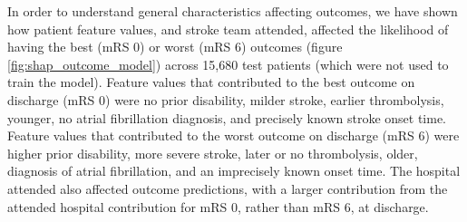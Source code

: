 In order to understand general characteristics affecting outcomes, we have shown how patient feature values, and stroke team attended, affected the likelihood of having the best (mRS 0) or worst (mRS 6) outcomes (figure \ref{fig:shap_outcome_model}) across 15,680 test patients (which were not used to train the model). Feature values that contributed to the best outcome on discharge (mRS 0) were no prior disability, milder stroke, earlier thrombolysis, younger, no atrial fibrillation diagnosis, and precisely known stroke onset time. Feature values that contributed to the worst outcome on discharge (mRS 6) were higher prior disability, more severe stroke, later or no thrombolysis, older, diagnosis of atrial fibrillation, and an imprecisely known onset time. The hospital attended also affected outcome predictions, with a  larger contribution from the attended hospital contribution for mRS 0, rather than mRS 6, at discharge. 


